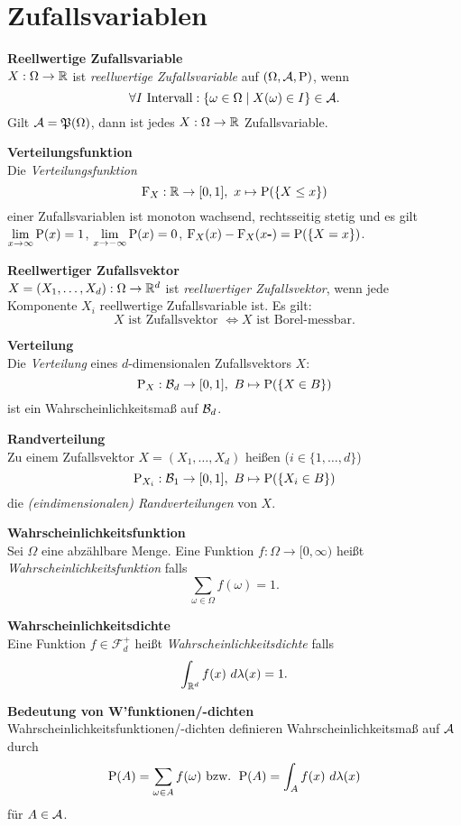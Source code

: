 \section{Zufallsvariablen}
\textbf{Reellwertige Zufallsvariable}\\
$X:\Omega\to\R$ ist \textit{reellwertige Zufallsvariable} auf $(\Omega,\A,\P)$, wenn
\[
	\forall I \text{ Intervall}: \{\omega\in\Omega\mid X(\omega)\in I\}\in\A.
\]
Gilt $\A=\mathfrak{P}(\Omega)$, dann ist jedes $X:\Omega\to\R$ Zufallsvariable.

\textbf{Verteilungsfunktion}\\
Die \textit{Verteilungsfunktion}
\[
	\F_X:\R\to[0,1],\ x\mapsto\P(\{X\leq x\})
\]
einer Zufallsvariablen ist monoton wachsend, rechtsseitig stetig und es gilt\\
$\lim\limits_{x\to\infty}\P(x)=1$,
$\lim\limits_{x\to -\infty}\P(x)=0$, 
\mbox{$\F_X(x)-\F_X(x\textbf{-})=\P(\{X=x\})$}.

\textbf{Reellwertiger Zufallsvektor}\\
$X=(X_1,\ldots,X_d):\Omega\to\R^d$ ist \textit{reellwertiger Zufallsvektor}, wenn jede
Komponente $X_i$ reellwertige Zufallsvariable ist. Es gilt:\\
\[
	X \text{ ist Zufallsvektor } \Leftrightarrow X \text{ ist Borel-messbar.}
\]

\textbf{Verteilung}\\
Die \textit{Verteilung} eines $d$-dimensionalen Zufallsvektors $X$: 
\[
	\P_X: \B{d}\to [0,1],\ B\mapsto\P(\{X\in B\})
\]
ist ein Wahrscheinlichkeitsmaß auf $\B{d}$.

\textbf{Randverteilung}\\
Zu einem Zufallsvektor $X=(X_1,\ldots,X_d)$ heißen ($i\in\{1,\ldots,d\}$)
\[
	\P_{X_i} :\B{1}\to[0,1],\ B\mapsto \P(\{X_i\in B\})
\]
die \textit{(eindimensionalen) Randverteilungen} von $X$.

\textbf{Wahrscheinlichkeitsfunktion}\\
Sei $\Omega$ eine abzählbare Menge. Eine Funktion $f:\Omega\to[0,\infty)$ heißt \textit{Wahrscheinlichkeitsfunktion} falls
\[
	  \sum_{\omega\in\Omega} f(\omega)=1.
\]

\textbf{Wahrscheinlichkeitsdichte}\\
Eine Funktion $f\in\mathcal{F}_d^+$ heißt \textit{Wahrscheinlichkeitsdichte} falls
\[
	 \int_{\R^d} f(x)~d\lambda(x)=1.
\]

\textbf{Bedeutung von W'funktionen/-dichten}\\
Wahrscheinlichkeitsfunktionen/-dichten definieren Wahrscheinlichkeitsmaß auf $\A$
durch 
\[
\P(A)=\sum_{\omega\in A}f(\omega) \text{ bzw. } \P(A)=\int_A f(x)~d\lambda(x)
\]
für $A\in\A$.

